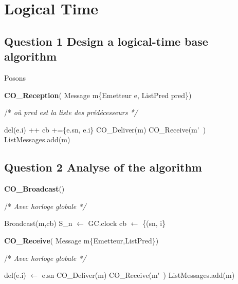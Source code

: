 \chapter{Logical Time}
\section{Question 1 Design a logical-time base algorithm}

Posons 
\begin{algorithm}
\caption{\textbf{CO\_Reception}( Message m\{Emetteur e, ListPred pred\})}
/* \textit{ où pred est la liste des prédécesseurs */}
\label{algo:recherche}
\begin{algorithmic}[1]
     \STATE  del(e.i) ++
     \STATE  cb +=\{e.sn, e.i\}
   \STATE  CO\_Deliver(m)
   CO\_Receive(m\'~)
   \ENDFOR
   \ELSE
   \STATE ListMessages.add(m)
  \ENDIF
 \end{algorithmic}
\end{algorithm}


\section{Question 2 Analyse of the algorithm}

\begin{algorithm}
\caption{\textbf{CO\_Broadcast}()}
/* \textit{ Avec horloge globale */}
\label{algo:broad}
\begin{algorithmic}[1]
\STATE Broadcast(m,cb)
\STATE S_n $\leftarrow$ GC.clock
\STATE cb $\leftarrow $ \{(sn, i\}
\end{algorithmic}
\end{algorithm}



\begin{algorithm}
\caption{\textbf{CO\_Receive}( Message m\{Emetteur,ListPred\})}
/* \textit{ Avec horloge globale */}
\label{algo:q3}
\begin{algorithmic}[1]
   \STATE  del(e.i) $\leftarrow$ e.sn
   \STATE  CO\_Deliver(m)
   CO\_Receive(m\'~)
   \ENDFOR
   \ELSE
   \STATE ListMessages.add(m)
  \ENDIF  
\end{algorithmic}
\end{algorithm}


